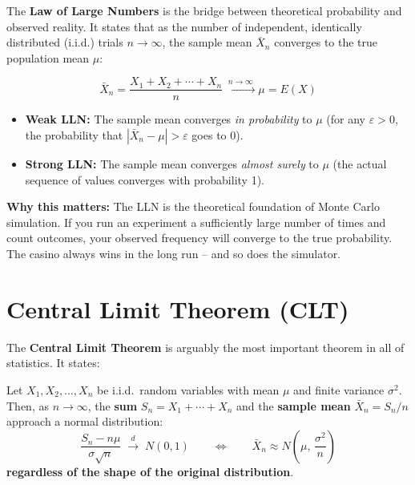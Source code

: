 \documentclass[11pt, letterpaper]{article}
\begin{document}
The \textbf{Law of Large Numbers} is the bridge between theoretical probability and observed reality. It states that as the number of independent, identically distributed (i.i.d.) trials $n \to \infty$, the sample mean $\bar{X}_n$ converges to the true population mean $\mu$:

\[
  \bar{X}_n = \frac{X_1 + X_2 + \cdots + X_n}{n} \xrightarrow{\;n \to \infty\;} \mu = E(X)
\]

\begin{itemize}[noitemsep]
  \item \textbf{Weak LLN:} The sample mean converges \emph{in probability} to $\mu$ (for any $\varepsilon > 0$, the probability that $|\bar{X}_n - \mu| > \varepsilon$ goes to 0).
  \item \textbf{Strong LLN:} The sample mean converges \emph{almost surely} to $\mu$ (the actual sequence of values converges with probability 1).
\end{itemize}

\begin{tcolorbox}[colback=part2bg, colframe=sectiongreen, arc=3pt, boxrule=1pt]
\textbf{Why this matters:} The LLN is the theoretical foundation of Monte Carlo simulation. If you run an experiment a sufficiently large number of times and count outcomes, your observed frequency will converge to the true probability. The casino always wins in the long run -- and so does the simulator.
\end{tcolorbox}

\section*{Central Limit Theorem (CLT)}

The \textbf{Central Limit Theorem} is arguably the most important theorem in all of statistics. It states:

\begin{tcolorbox}[colback=part2bg, colframe=sectiongreen,
  title={\bfseries Central Limit Theorem}, arc=3pt, boxrule=1pt]
Let $X_1, X_2, \ldots, X_n$ be i.i.d.\ random variables with mean $\mu$ and finite variance $\sigma^2$. Then, as $n \to \infty$, the \textbf{sum} $S_n = X_1 + \cdots + X_n$ and the \textbf{sample mean} $\bar{X}_n = S_n/n$ approach a normal distribution:
\[
  \frac{S_n - n\mu}{\sigma\sqrt{n}} \;\xrightarrow{d}\; N(0,1)
  \qquad \Longleftrightarrow \qquad
  \bar{X}_n \approx N\!\left(\mu,\, \frac{\sigma^2}{n}\right)
\]
\textbf{regardless of the shape of the original distribution}.
\end{tcolorbox}
\end{document}
